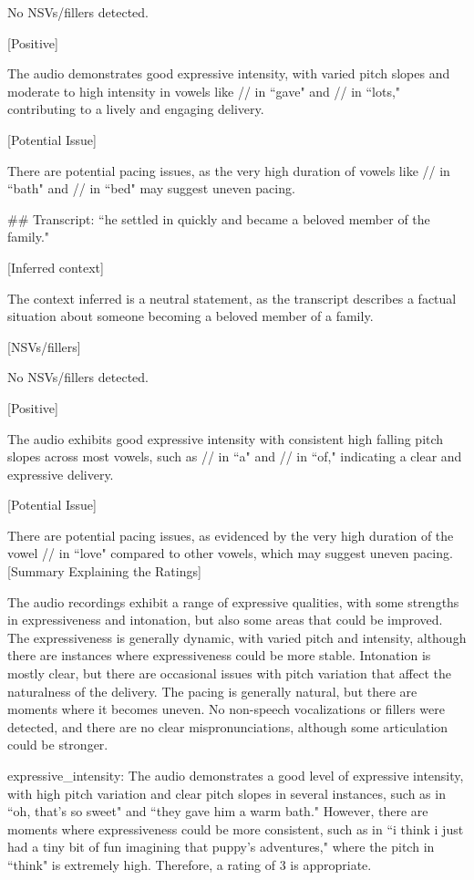 \begin{tcolorbox}  

No NSVs/fillers detected.


[Positive]  

The audio demonstrates good expressive intensity, with varied pitch slopes and moderate to high intensity in vowels like // in ``gave" and // in ``lots," contributing to a lively and engaging delivery.


[Potential Issue]  

There are potential pacing issues, as the very high duration of vowels like // in ``bath" and // in ``bed" may suggest uneven pacing.


\#\# Transcript: ``he settled in quickly and became a beloved member of the family."

[Inferred context]

The context inferred is a neutral statement, as the transcript describes a factual situation about someone becoming a beloved member of a family.


[NSVs/fillers]

No NSVs/fillers detected.


[Positive]

The audio exhibits good expressive intensity with consistent high falling pitch slopes across most vowels, such as // in ``a" and // in ``of," indicating a clear and expressive delivery.


[Potential Issue]

There are potential pacing issues, as evidenced by the very high duration of the vowel // in ``love" compared to other vowels, which may suggest uneven pacing. \\

[Summary Explaining the Ratings]

The audio recordings exhibit a range of expressive qualities, with some strengths in expressiveness and intonation, but also some areas that could be improved. The expressiveness is generally dynamic, with varied pitch and intensity, although there are instances where expressiveness could be more stable. Intonation is mostly clear, but there are occasional issues with pitch variation that affect the naturalness of the delivery. The pacing is generally natural, but there are moments where it becomes uneven. No non-speech vocalizations or fillers were detected, and there are no clear mispronunciations, although some articulation could be stronger.


expressive\_intensity: The audio demonstrates a good level of expressive intensity, with high pitch variation and clear pitch slopes in several instances, such as in ``oh, that's so sweet" and ``they gave him a warm bath." However, there are moments where expressiveness could be more consistent, such as in ``i think i just had a tiny bit of fun imagining that puppy's adventures," where the pitch in ``think" is extremely high. Therefore, a rating of 3 is appropriate.



\end{tcolorbox}
